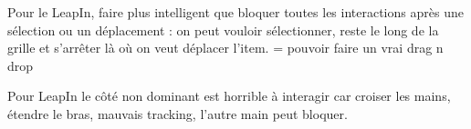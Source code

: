 Pour le LeapIn, faire plus intelligent que bloquer toutes les interactions après une sélection ou un déplacement : on peut vouloir sélectionner, reste le long de la grille et s'arrêter là où on veut déplacer l'item. = pouvoir faire un vrai drag n drop

Pour LeapIn le côté non dominant est horrible à interagir car croiser les mains, étendre le bras, mauvais tracking, l'autre main peut bloquer.

 





